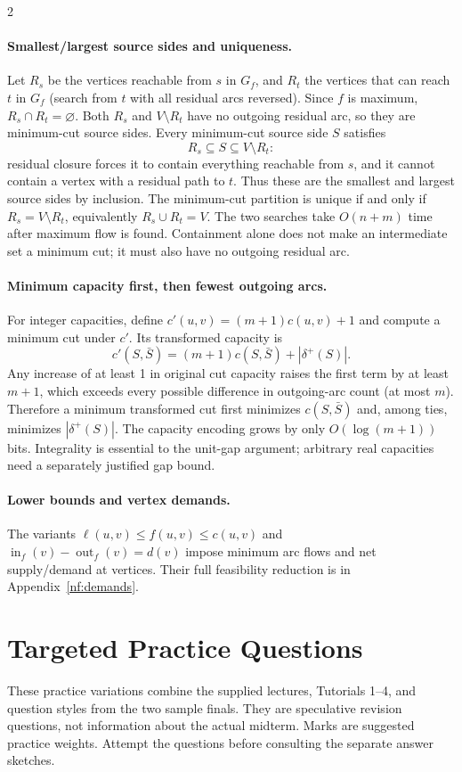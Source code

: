 \documentclass[8pt]{extarticle}
\theoremstyle{definition}
\begin{document}
\begin{multicols*}{2}
\paragraph{Smallest/largest source sides and uniqueness.}
Let $R_s$ be the vertices reachable from $s$ in $G_f$, and $R_t$ the
vertices that can reach $t$ in $G_f$ (search from $t$ with all residual
arcs reversed). Since $f$ is maximum, $R_s\cap R_t=\varnothing$.
Both $R_s$ and $V\setminus R_t$ have no outgoing residual arc, so they
are minimum-cut source sides. Every minimum-cut source side $S$ satisfies
\[
 R_s\subseteq S\subseteq V\setminus R_t:
\]
residual closure forces it to contain everything reachable from $s$,
and it cannot contain a vertex with a residual path to $t$.
Thus these are the smallest and largest source sides by inclusion.
The minimum-cut partition is unique if and only if
$R_s=V\setminus R_t$, equivalently $R_s\cup R_t=V$.
The two searches take $O(n+m)$ time after maximum flow is found.
Containment alone does not make an intermediate set a minimum cut;
it must also have no outgoing residual arc.

\paragraph{Minimum capacity first, then fewest outgoing arcs.}
For integer capacities, define $c'(u,v)=(m+1)c(u,v)+1$ and compute a minimum cut
under $c'$. Its transformed capacity is
\[
 c'(S,\bar S)=(m+1)c(S,\bar S)+|\delta^+(S)|.
\]
Any increase of at least 1 in original cut capacity raises the first term
by at least $m+1$, which exceeds every possible difference in outgoing-arc
count (at most $m$). Therefore a minimum transformed cut first minimizes
$c(S,\bar S)$ and, among ties, minimizes $|\delta^+(S)|$. The capacity encoding grows
by only $O(\log(m+1))$ bits. Integrality is essential to the unit-gap argument;
arbitrary real capacities need a separately justified gap bound.\par


\paragraph{Lower bounds and vertex demands.}
The variants $\ell(u,v)\le f(u,v)\le c(u,v)$ and
$\operatorname{in}_f(v)-\operatorname{out}_f(v)=d(v)$ impose minimum arc flows
and net supply/demand at vertices. Their full feasibility reduction is in
Appendix~\ref{nf:demands}.


\appendix

\section{Targeted Practice Questions}\label{prac:questions}\label{prac:main}
These practice variations combine the supplied lectures, Tutorials 1--4,
and question styles from the two sample finals.  They are speculative
revision questions, not information about the actual midterm.  Marks are
suggested practice weights.  Attempt the questions before consulting the
separate answer sketches.


\end{multicols*}
\end{document}
